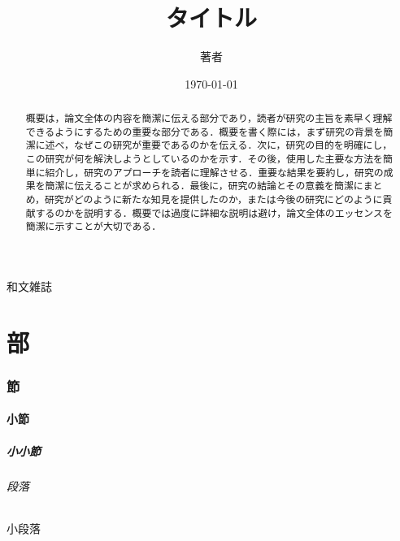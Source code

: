 \documentclass[dvipdfmx]{jsarticle} %
\title{タイトル}
\author{著者}
\date{\today}
\theoremstyle{definition} %
\begin{document}

\maketitle %

\begin{abstract} %
  概要は，論文全体の内容を簡潔に伝える部分であり，読者が研究の主旨を素早く理解できるようにするための重要な部分である．概要を書く際には，まず研究の背景を簡潔に述べ，なぜこの研究が重要であるのかを伝える．次に，研究の目的を明確にし，この研究が何を解決しようとしているのかを示す．その後，使用した主要な方法を簡単に紹介し，研究のアプローチを読者に理解させる．重要な結果を要約し，研究の成果を簡潔に伝えることが求められる．最後に，研究の結論とその意義を簡潔にまとめ，研究がどのように新たな知見を提供したのか，または今後の研究にどのように貢献するのかを説明する．概要では過度に詳細な説明は避け，論文全体のエッセンスを簡潔に示すことが大切である．
\end{abstract}

\hrulefill %

\setcounter{tocdepth}{3} %
\tableofcontents %

\newpage %

和文雑誌

\part{部}
\section{節}
\subsection{小節}
\subsubsection{小小節}
\paragraph{段落}
\subparagraph{小段落}
\end{document}
